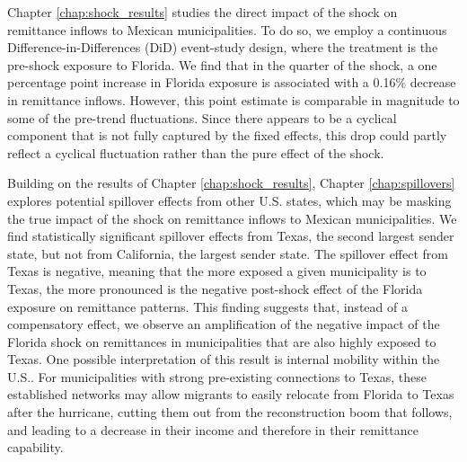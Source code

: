 \par
Chapter \ref{chap:shock_results} studies the direct impact of the shock on remittance inflows to Mexican municipalities. To do so, we employ a continuous Difference-in-Differences (DiD) event-study design, where the treatment is the pre-shock exposure to Florida. We find that in the quarter of the shock, a one percentage point increase in Florida exposure is associated with a 0.16\% decrease in remittance inflows. However, this point estimate is comparable in magnitude to some of the pre-trend fluctuations. Since there appears to be a cyclical component that is not fully captured by the fixed effects, this drop could partly reflect a cyclical fluctuation rather than the pure effect of the shock. 
\par
Building on the results of Chapter \ref{chap:shock_results}, Chapter \ref{chap:spillovers} explores potential spillover effects from other U.S. states, which may be masking the true impact of the shock on remittance inflows to Mexican municipalities. We find statistically significant spillover effects from Texas, the second largest sender state, but not from California, the largest sender state. The spillover effect from Texas is negative, meaning that the more exposed a given municipality is to Texas, the more pronounced is the negative post-shock effect of the Florida exposure on remittance patterns. This finding suggests that, instead of a compensatory effect, we observe an amplification of the negative impact of the Florida shock on remittances in municipalities that are also highly exposed to Texas. One possible interpretation of this result is internal mobility within the U.S.. For municipalities with strong pre-existing connections to Texas, these established networks may allow migrants to easily relocate from Florida to Texas after the hurricane, cutting them out from the reconstruction boom that follows, and leading to a decrease in their income and therefore in their remittance capability.